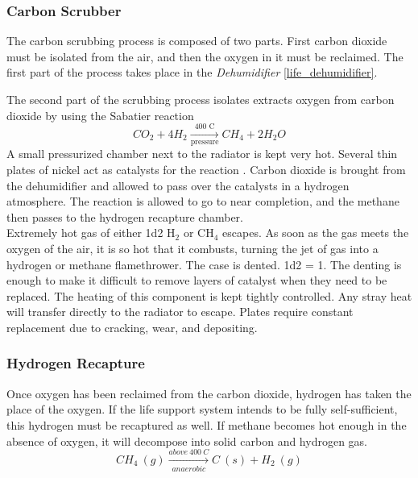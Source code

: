 \documentclass[a4paper]{article}
\begin{document}
\vspace{-0.5cm} \hspace{-18pt} \subsubsection{Carbon Scrubber} \label{life_c_scrubber} \vspace{-0.2cm}
The carbon scrubbing process is composed of two parts. First carbon dioxide must be isolated from the air, and then the oxygen in it must be reclaimed. The first part of the process takes place in the \textit{Dehumidifier} \ref{life_dehumidifier}.

The second part of the scrubbing process isolates extracts oxygen from carbon dioxide by using the Sabatier reaction 
\begin{equation} \label{sabatier_reaction}
CO_2 + 4 H_2 \xrightarrow[\text{pressure}]{\text{400 C}} CH_4 + 2 H_2O
\end{equation}
A small pressurized chamber next to the radiator is kept very hot. Several thin plates of nickel act as catalysts for the reaction \cite{recycling_water_and_air}. Carbon dioxide is brought from the dehumidifier and allowed to pass over the catalysts in a hydrogen atmosphere. The reaction is allowed to go to near completion, and the methane then passes to the hydrogen recapture chamber.   
\\ \pbhw
{Extremely hot gas of either 1d2 H$_2$ or CH$_4$ escapes. As soon as the gas meets the oxygen of the air, it is so hot that it combusts, turning the jet of gas into a hydrogen or methane flamethrower.}
{The case is dented. \newline \hspace{3pt} 1d2 = 1. The denting is enough to make it difficult to remove layers of catalyst when they need to be replaced.}
{The heating of this component is kept tightly controlled. Any stray heat will transfer directly to the radiator to escape. }
{Plates require constant replacement due to cracking, wear, and depositing. }


\vspace{-0.5cm} \hspace{-18pt} \subsubsection{Hydrogen Recapture} \label{life_h2_recapture} \vspace{-0.2cm}
Once oxygen has been reclaimed from the carbon dioxide, hydrogen has taken the place of the oxygen. If the life support system intends to be fully self-sufficient, this hydrogen must be recaptured as well. If methane becomes hot enough in the absence of oxygen, it will decompose into solid carbon and hydrogen gas. 
\begin{equation} \label{anaerobic_decomposition_of_methane}
CH_4\ (g) \xrightarrow[anaerobic]{above\ 400\ C} C\ (s) + H_2\ (g)
\end{equation}
\end{document}
